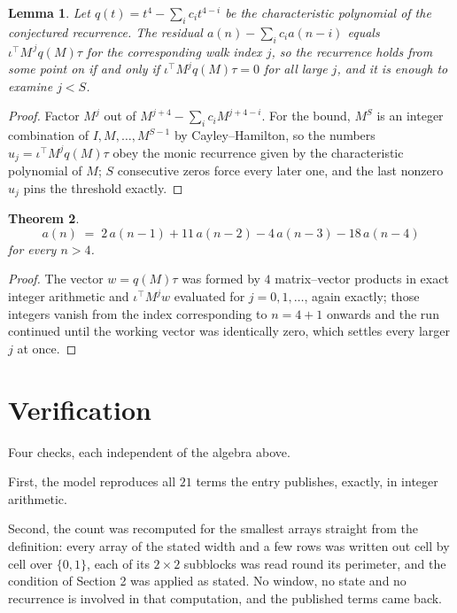 \documentclass[11pt,a4paper]{article}
\theoremstyle{plain}
\newtheorem{theorem}{Theorem}
\newtheorem{lemma}[theorem]{Lemma}
\theoremstyle{definition}
\begin{document}
\begin{lemma}\label{lem:crit}
Let $q(t)=t^{4}-\sum_i c_it^{4-i}$ be the characteristic polynomial of the
conjectured recurrence. The residual $a(n)-\sum_ic_ia(n-i)$ equals
$\iota^{\!\top}M^{\,j}q(M)\tau$ for the corresponding walk index $j$, so the recurrence
holds from some point on if and only if $\iota^{\!\top}M^{j}q(M)\tau=0$ for all large $j$,
and it is enough to examine $j<S$.
\end{lemma}

\begin{proof}
Factor $M^{j}$ out of $M^{j+4}-\sum_ic_iM^{j+4-i}$. For the bound, $M^{S}$
is an integer combination of $I,M,\dots,M^{S-1}$ by Cayley--Hamilton, so the numbers
$u_j=\iota^{\!\top}M^{j}q(M)\tau$ obey the monic recurrence given by the characteristic
polynomial of $M$; $S$ consecutive zeros force every later one, and the last nonzero $u_j$
pins the threshold exactly.
\end{proof}

\begin{theorem}
\[
a(n)\;=\;2\,a(n-1) + 11\,a(n-2) - 4\,a(n-3) - 18\,a(n-4)
\]
for every $n>4$.
\end{theorem}

\begin{proof}
The vector $w=q(M)\tau$ was formed by $4$ matrix--vector products in exact integer
arithmetic and $\iota^{\!\top}M^{j}w$ evaluated for $j=0,1,\dots$, again exactly; those
integers vanish from the index corresponding to $n=4+1$ onwards and the run continued
until the working vector was identically zero, which settles every larger $j$ at once.
\end{proof}

\section{Verification}

Four checks, each independent of the algebra above.

First, the model reproduces all $21$ terms the entry publishes, exactly, in integer
arithmetic.

Second, the count was recomputed for the smallest arrays straight from the definition: every
array of the stated width and a few rows was written out cell by cell over $\{0,1\}$, each of
its $2\times2$ subblocks was read round its perimeter, and the condition of Section 2 was
applied as stated. No window, no state and no recurrence is involved in that computation, and
the published terms came back.
\end{document}
